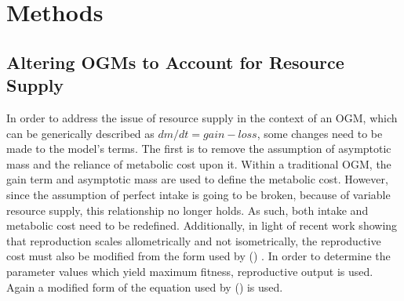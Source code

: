 \documentclass[a4paper, 11pt, hidelinks]{article} %
\newcommand{\authorcite}[1]{\citeauthor{#1} (\citeyear{#1})}
\begin{document}
	
\section{Methods}
	
	\subsection{Altering OGMs to Account for Resource Supply}
	In order to address the issue of resource supply in the context of an OGM, which can be generically described as $dm/dt = gain - loss$, some changes need to be made to the model's terms.  The first is to remove the assumption of asymptotic mass and the reliance of metabolic cost upon it.  Within a traditional OGM, the gain term and asymptotic mass are used to define the metabolic cost.  However, since the assumption of perfect intake is going to be broken, because of variable resource supply, this relationship no longer holds.  As such, both intake and metabolic cost need to be redefined.  Additionally, in light of recent work showing that reproduction scales allometrically and not isometrically, the reproductive cost must also be modified from the form used by \citeauthor{Charnov2001} (\citeyear{Charnov2001}) \parencite{Barneche2018, Marshall2019}.  In order to determine the parameter values which yield maximum fitness, reproductive output is used.  Again a modified form of the equation used by \authorcite{Charnov2001} is used.
	
\end{document}

